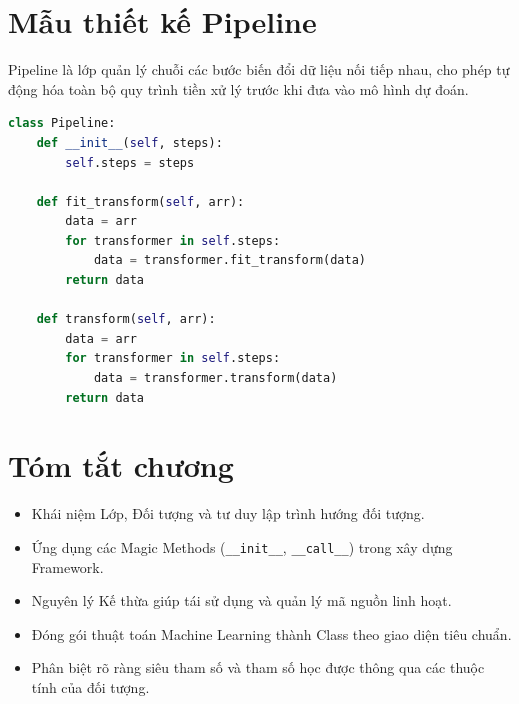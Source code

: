 \section{Mẫu thiết kế Pipeline}

Pipeline là lớp quản lý chuỗi các bước biến đổi dữ liệu nối tiếp nhau, cho phép tự động hóa toàn bộ quy trình tiền xử lý trước khi đưa vào mô hình dự đoán.

\begin{lstlisting}[caption={Triển khai cấu trúc Pipeline cơ bản}, language=Python]
class Pipeline:
    def __init__(self, steps):
        self.steps = steps

    def fit_transform(self, arr):
        data = arr
        for transformer in self.steps:
            data = transformer.fit_transform(data)
        return data

    def transform(self, arr):
        data = arr
        for transformer in self.steps:
            data = transformer.transform(data)
        return data
\end{lstlisting}

\section{Tóm tắt chương}

\begin{itemize}
    \item Khái niệm Lớp, Đối tượng và tư duy lập trình hướng đối tượng.
    \item Ứng dụng các Magic Methods (\texttt{\_\_init\_\_}, \texttt{\_\_call\_\_}) trong xây dựng Framework.
    \item Nguyên lý Kế thừa giúp tái sử dụng và quản lý mã nguồn linh hoạt.
    \item Đóng gói thuật toán Machine Learning thành Class theo giao diện tiêu chuẩn.
    \item Phân biệt rõ ràng siêu tham số và tham số học được thông qua các thuộc tính của đối tượng.
\end{itemize}

